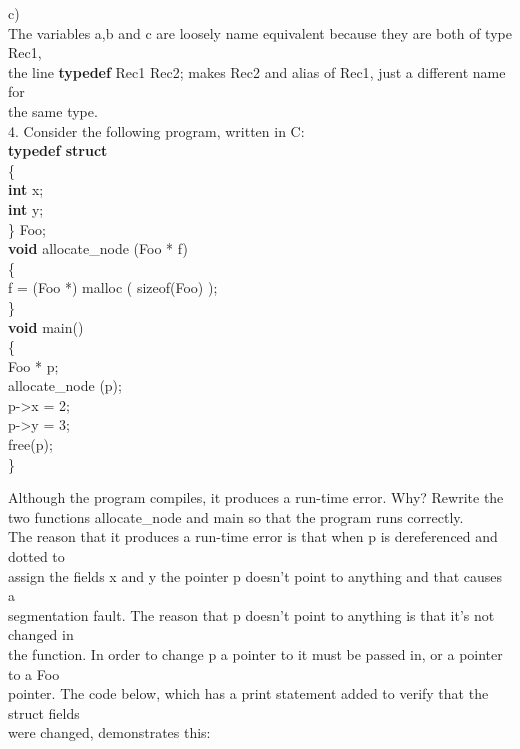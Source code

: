 \documentclass[12pt]{article}
\begin{document}
\begin{flushleft}
\qquad c)\\
\qquad \qquad The variables {\selectfont a,b} and {\selectfont c} are loosely name equivalent because they are both of type {\selectfont Rec1},\\
\qquad \qquad the line {\selectfont \textbf{typedef} Rec1 Rec2;} makes {\selectfont Rec2} and alias of {\selectfont Rec1}, just a different name for\\
\qquad \qquad the same type.\\
[4mm]

4. Consider the following program, written in C:\\
[2mm]

{\selectfont
\qquad \textbf{typedef struct}\\
\qquad \{\\
\qquad \qquad \textbf{int} x;\\
\qquad \qquad \textbf{int} y;\\
\qquad \} Foo;\\
[2mm]
\qquad \textbf{void} allocate\_node (Foo * f)\\
\qquad \{\\
\qquad \qquad f = (Foo *) malloc ( sizeof(Foo) );\\
\qquad \}\\
[2mm]
\qquad \textbf{void} main()\\
\qquad \{\\
\qquad \qquad Foo * p;\\
\qquad \qquad allocate\_node (p);\\
\qquad \qquad p->x = 2;\\
\qquad \qquad p->y = 3;\\
\qquad \qquad free(p);\\
\qquad \}\\
[2mm]
}

Although the program compiles, it produces a run-time error. Why?  Rewrite the two functions allocate\_node and main so that the program runs correctly.\\
[2mm]

\qquad \qquad The reason that it produces a run-time error is that when {\selectfont p} is dereferenced and dotted to\\
\qquad \qquad assign the fields {\selectfont x} and {\selectfont y} the pointer {\selectfont p} doesn't point to anything and that causes a\\
\qquad \qquad segmentation fault.  The reason that {\selectfont p} doesn't point to anything is that it's not changed in\\
\qquad \qquad the function.  In order to change {\selectfont p} a pointer to it must be passed in, or a pointer to a {\selectfont Foo}\\
\qquad \qquad pointer.  The code below, which has a print statement added to verify that the struct fields\\
\qquad \qquad were changed, demonstrates this:\\
[2mm]


\end{flushleft}
\end{document}
